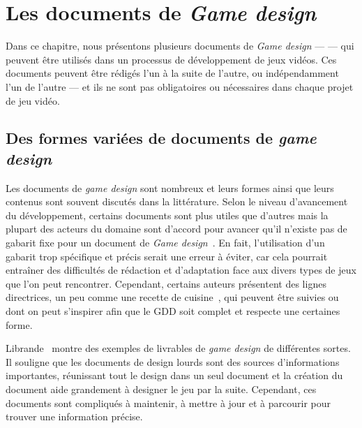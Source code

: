 \chapter{Les documents de \emph{Game design}}

\label{chap.design_doc}

Dans ce chapitre, nous pr\'esentons plusieurs documents de \emph{Game design} ---  --- qui peuvent être utilisés dans un processus de développement de jeux vidéos.
Ces documents peuvent être rédigés l'un à la suite de l'autre, ou indépendamment l'un de l'autre --- et ils ne sont pas obligatoires ou nécessaires dans chaque projet de jeu vidéo.






\section{Des formes variées de documents de \emph{game design}}

Les documents de \emph{game design} sont nombreux et leurs formes ainsi que leurs contenus sont souvent discut\'es dans la littérature.
Selon le niveau d'avancement du développement, certains documents sont plus utiles que d'autres mais la plupart des acteurs du domaine sont d'accord pour avancer qu'il n'existe pas de gabarit fixe pour un document de \emph{Game design}~\cite{GD_theory_rouse}.
En fait, l'utilisation d'un gabarit trop sp\'ecifique et précis serait une erreur à \'eviter, car cela pourrait entraîner des difficultés de rédaction et d'adaptation face aux divers types de jeux que l'on peut rencontrer.
Cependant, certains auteurs présentent des lignes directrices, un peu comme une recette de cuisine~\cite{LevelUpRogers2014}, qui peuvent être suivies ou dont on peut s'inspirer afin que le GDD soit complet et respecte une certaines forme. 

Librande~\cite{onepage_librande} montre des exemples de livrables de \emph{game design} de différentes sortes.
Il souligne que les documents de design lourds sont des sources d'informations importantes, réunissant tout le design dans un seul document et la création du document aide grandement à designer le jeu par la suite.
Cependant, ces documents sont compliqués à maintenir, \`a mettre à jour et à parcourir pour trouver une information précise.


